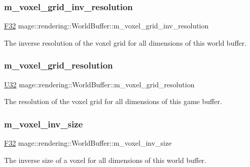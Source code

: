 \subsubsection{\texorpdfstring{m\+\_\+voxel\+\_\+grid\+\_\+inv\+\_\+resolution}{m\_voxel\_grid\_inv\_resolution}}
{\footnotesize\ttfamily \hyperlink{namespacemage_aa97e833b45f06d60a0a9c4fc22ae02c0}{F32} mage\+::rendering\+::\+World\+Buffer\+::m\+\_\+voxel\+\_\+grid\+\_\+inv\+\_\+resolution}

The inverse resolution of the voxel grid for all dimensions of this world buffer. \hypertarget{structmage_1_1rendering_1_1_world_buffer_ad1a59cf980681b0b9ec246057fe2ed70}{}\label{structmage_1_1rendering_1_1_world_buffer_ad1a59cf980681b0b9ec246057fe2ed70} 
\subsubsection{\texorpdfstring{m\+\_\+voxel\+\_\+grid\+\_\+resolution}{m\_voxel\_grid\_resolution}}
{\footnotesize\ttfamily \hyperlink{namespacemage_a41c104c036fba3756a74e19f793eeaa1}{U32} mage\+::rendering\+::\+World\+Buffer\+::m\+\_\+voxel\+\_\+grid\+\_\+resolution}

The resolution of the voxel grid for all dimensions of this game buffer. \hypertarget{structmage_1_1rendering_1_1_world_buffer_a86982007f533ae368a5c3b09dcbf4db6}{}\label{structmage_1_1rendering_1_1_world_buffer_a86982007f533ae368a5c3b09dcbf4db6} 
\subsubsection{\texorpdfstring{m\+\_\+voxel\+\_\+inv\+\_\+size}{m\_voxel\_inv\_size}}
{\footnotesize\ttfamily \hyperlink{namespacemage_aa97e833b45f06d60a0a9c4fc22ae02c0}{F32} mage\+::rendering\+::\+World\+Buffer\+::m\+\_\+voxel\+\_\+inv\+\_\+size}

The inverse size of a voxel for all dimensions of this world buffer. \hypertarget{structmage_1_1rendering_1_1_world_buffer_af18be87bdb94066df7bd5e52409b1c16}{}\label{structmage_1_1rendering_1_1_world_buffer_af18be87bdb94066df7bd5e52409b1c16} 
